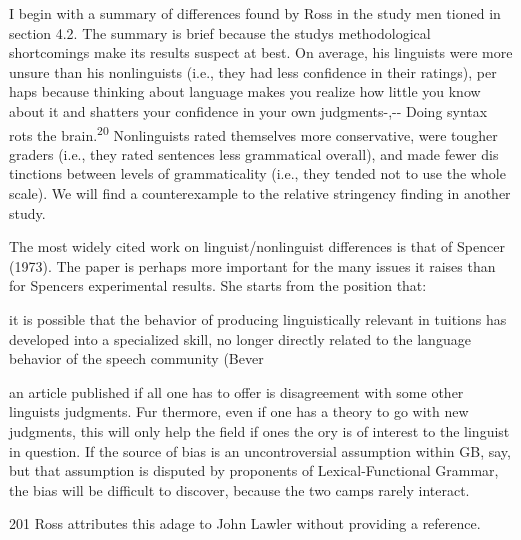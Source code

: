 \begin{styleTextbody}
I begin with a summary of differences found by Ross in the study men\- tioned in section 4.2. The summary is brief because the study{\textquotesingle}s methodological shortcomings make its results suspect at best. On average, his linguists were more unsure than his nonlinguists (i.e., they had less confidence in their ratings), per\- haps because thinking about language makes you realize how little you know about it and shatters your confidence in your own judgments-,-{}- {\textquotedbl}Doing syntax rots the brain.{\textquotedbl}\textsuperscript{20}\textsuperscript{ }Nonlinguists rated themselves more conservative, were tougher graders (i.e., they rated sentences less grammatical overall), and made fewer dis\- tinctions between levels of grammaticality (i.e., they tended not to use the whole scale). We will find a counterexample to the relative stringency finding in another study.
\end{styleTextbody}


\begin{styleTextbody}
The most widely cited work on linguist/nonlinguist differences is that of Spencer (1973). The paper is perhaps more important for the many issues it raises than for Spencer{\textquotesingle}s experimental results. She starts from the position that:
\end{styleTextbody}


\begin{styleTextbody}
it is possible that the behavior of producing linguistically relevant in\- tuitions has developed into a specialized skill, no longer directly related to the language behavior of the speech community (Bever
\end{styleTextbody}


\begin{styleStandard}
an article published if all one has to offer is disagreement with some other linguist{\textquotesingle}s judgments. Fur\- thermore, even if one has a theory to go with new judgments, this will only help the field if one{\textquotesingle}s the\- ory is of interest to the linguist in question. If the source of bias is an uncontroversial assumption within GB, say, but that assumption is disputed by proponents of Lexical-Functional Grammar, the bias will be difficult to discover, because the two camps rarely interact.
\end{styleStandard}


\begin{styleStandard}
201 Ross attributes this adage to John Lawler without providing a reference.
\end{styleStandard}


